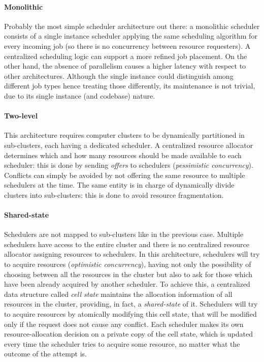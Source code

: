 \paragraph{Monolithic}
Probably the most simple scheduler architecture out there: a monolithic scheduler consists of a single instance scheduler applying the same scheduling algorithm for every incoming job (so there is no concurrency between resource requesters).
A centralized scheduling logic can support a more refined job placement.
On the other hand, the absence of parallelism causes a higher latency with respect to other architectures.
Although the single instance could distinguish among different job types hence treating those differently, its maintenance is not trivial, due to its single instance (and codebase) nature.

\paragraph{Two-level}
This architecture requires computer clusters to be dynamically partitioned in sub-clusters, each having a dedicated scheduler.
A centralized resource allocator determines which and how many resources should be made available to each scheduler: this is done by sending \textit{offers} to schedulers (\textit{pessimistic concurrency}).
Conflicts can simply be avoided by not offering the same resource to multiple schedulers at the time.
The same entity is in charge of dynamically divide clusters into sub-clusters: this is done to avoid resource fragmentation.

\paragraph{Shared-state}
Schedulers are not mapped to sub-clusters like in the previous case.
Multiple schedulers have access to the entire cluster and there is no centralized resource allocator assigning resources to schedulers.
In this architecture, schedulers will try to acquire resources (\textit{optimistic concurrency}), having not only the possibility of choosing between all the resources in the cluster but also to ask for those which have been already acquired by another scheduler.
To achieve this, a centralized data structure called \textit{cell state} maintains the allocation information of all resources in the cluster, providing, in fact, a \textit{shared-state} of it.
Schedulers will try to acquire resources by atomically modifying this cell state, that will be modified only if the request does not cause any conflict.
Each scheduler makes its own resource-allocation decision on a private copy of the cell state, which is updated every time the scheduler tries to acquire some resource, no matter what the outcome of the attempt is.